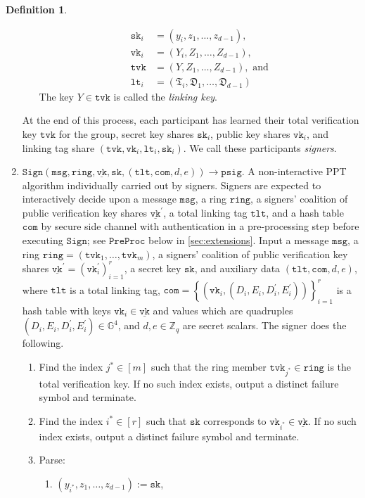\documentclass[11pt]{article}
\theoremstyle{definition}
\newtheorem{definition}[definition]{Definition}
\newcommand{\G}{\mathbb{G}}
\newcommand{\sk}{\texttt{sk}}
\newcommand{\vk}{\texttt{vk}}
\newcommand{\lt}{\texttt{lt}}
\newcommand{\tlt}{\texttt{tlt}}
\newcommand{\tvk}{\texttt{tvk}}
\newcommand{\ring}{\texttt{ring}}
\newcommand{\VK}{\underline{\texttt{vk}}}
\newcommand{\psig}{\texttt{psig}}
\newcommand{\com}{\texttt{com}}
\newcommand{\Zq}{\mathbb{Z}_q}
\newcommand{\msg}{\texttt{msg}}
\newcommand{\preproc}{\texttt{PreProc}}
\newcommand{\sign}{\texttt{Sign}}
\begin{document}
\begin{definition}
\begin{enumerate}
\begin{enumerate}
\begin{align*}
\sk_i &= (y_i, z_1, \ldots, z_{d-1}), \\
\vk_i &= (Y_i, Z_1, \ldots, Z_{d-1}), \\
\tvk &= (Y, Z_1, \ldots, Z_{d-1}),\text{ and}\\
\lt_i &= (\mathfrak{T}_i, \mathfrak{D}_1, \ldots, \mathfrak{D}_{d-1})
\end{align*}
The key $Y \in \tvk$ is called the \textit{linking key}. 
\end{enumerate}
At the end of this process, each participant has learned their total verification key $\tvk$ for the group, secret key shares $\sk_i$, public key shares $\vk_i$, and linking tag share $(\tvk, \vk_i, \lt_i, \sk_i)$. We call these participants \textit{signers}.


\item $\sign(\msg, \ring, \VK,  \sk, (\tlt, \texttt{com}, d, e)) \to \psig$. 
A non-interactive PPT algorithm individually carried out by signers. Signers are expected to interactively decide upon a message $\msg$, a ring $\ring$, a signers' coalition of public verification key shares $\VK^\prime$, a total linking tag $\tlt$, and a hash table $\texttt{com}$ by secure side channel with authentication in a pre-processing step before executing $\sign$; see $\preproc$ below in \cref{sec:extensions}. Input a message $\msg$, a ring $\ring = (\tvk_1, \ldots, \tvk_m)$, a signers' coalition of public verification key shares $\VK^\prime = (\vk_i^\prime)_{i=1}^{r}$, a secret key $\sk$, and auxiliary data $(\tlt, \texttt{com}, d, e)$, where $\tlt$ is a total linking tag, $\com = \left\{(\vk_i, (D_i, E_i, D_i^\prime, E_i^\prime))\right\}_{i=1}^{r}$ is a hash table with keys $\vk_i \in \VK$ and values which are quadruples $(D_i, E_i, D^\prime_i, E^\prime_i) \in \G^4$, and $d, e \in \Zq$ are secret scalars.
The signer does the following.
\begin{enumerate}
\item  Find the index $j^* \in [m]$ such that the ring member $\tvk_{j^*} \in \ring$ is the total verification key. If no such index exists, output a distinct failure symbol and terminate.
\item Find the index $i^* \in [r]$ such that $\sk$ corresponds to $\vk_{i^*} \in \VK$. If no such index exists, output a distinct failure symbol and terminate.
\item Parse:
\begin{enumerate}
\item $(y_{i^*}, z_1, \ldots, z_{d-1}) := \sk$, 

\end{enumerate}
\end{enumerate}
\end{enumerate}
\end{definition}
\end{document}
